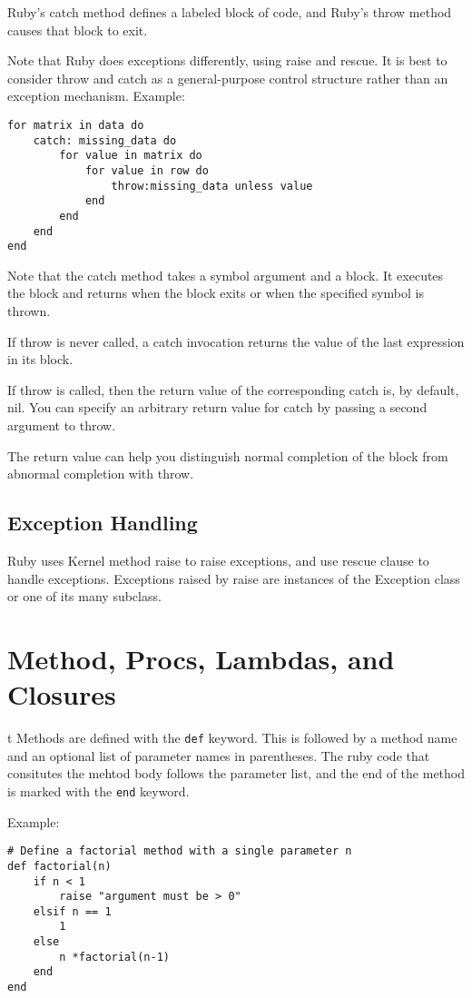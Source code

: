 \documentclass[11pt, a4paper]{book}
\begin{document}
Ruby's catch method defines a labeled block of code, and Ruby's throw method
causes that block to exit.

Note that Ruby does exceptions differently, using raise and rescue. It is best
to consider throw and catch as a general-purpose control structure rather than
an exception mechanism. Example:
\begin{verbatim}
for matrix in data do
    catch: missing_data do
        for value in matrix do
            for value in row do
                throw:missing_data unless value
            end
        end
    end
end
\end{verbatim}
Note that the catch method takes a symbol argument and a block. It executes the
block and returns when the block exits or when the specified symbol is thrown.

If throw is never called, a catch invocation returns the value of the last
expression in its block.

If throw is called, then the return value of the corresponding catch is, by
default, nil. You can specify an arbitrary return value for catch by passing a
second argument to throw.

The return value can help you distinguish normal completion of the block from
abnormal completion with throw.

\section{Exception Handling}
Ruby uses Kernel method raise to raise exceptions, and use rescue clause to
handle exceptions. Exceptions raised by raise are instances of the Exception
class or one of its many subclass.

\chapter{Method, Procs, Lambdas, and Closures}t
Methods are defined with the \verb|def| keyword. This is followed by a method
name and an optional list of parameter names in parentheses. The ruby code that
consitutes the mehtod body follows the parameter list, and the end of the method
is marked with the \verb|end| keyword. 

Example:
\begin{verbatim}
# Define a factorial method with a single parameter n
def factorial(n)
    if n < 1
        raise "argument must be > 0"
    elsif n == 1
        1
    else
        n *factorial(n-1)
    end
end
\end{verbatim}
\end{document}
